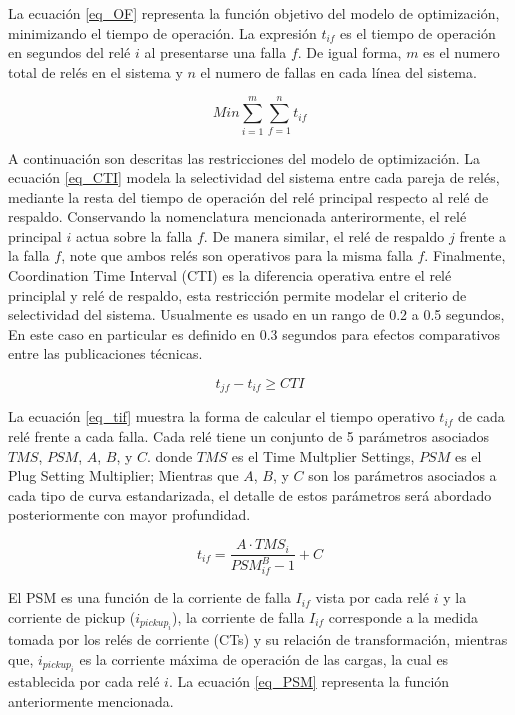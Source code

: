 \documentclass[journal,article,submit,pdftex,moreauthors]{Definitions/mdpi}
\begin{document}
La ecuación \ref{eq_OF} representa la función objetivo del modelo de optimización, minimizando el tiempo de operación. La expresión $t_{if}$ es el tiempo de operación en segundos del relé $i$ al presentarse una falla $f$. De igual forma, $m$ es el numero total de relés en el sistema y $n$ el numero de fallas en cada línea del sistema. 

\begin{equation}\label{eq_OF}
    Min \sum_{i=1}^m \sum_{f=1}^n t_{if}
\end{equation}

A continuación son descritas las restricciones del modelo de optimización. La ecuación \ref{eq_CTI} modela la selectividad del sistema entre cada pareja de relés, mediante la resta del tiempo de operación del relé principal respecto al relé de respaldo. Conservando la nomenclatura mencionada anterirormente, el relé principal $i$ actua sobre la falla $f$. De manera similar, el relé de respaldo $j$ frente a la falla $f$, note que ambos relés son operativos para la misma falla $f$. Finalmente, Coordination Time Interval (CTI) es la diferencia operativa entre el relé principlal y relé de respaldo, esta restricción permite modelar el criterio de selectividad del sistema. Usualmente es usado en un rango de 0.2 a 0.5 segundos, En este caso en particular es definido en 0.3 segundos para efectos comparativos entre las publicaciones técnicas.

\begin{equation}\label{eq_CTI}
    t_{jf} - t_{if} \geq CTI
\end{equation}

La ecuación \ref{eq_tif} muestra la forma de calcular el tiempo operativo $t_{if}$ de cada relé frente a cada falla. Cada relé tiene un conjunto de 5 parámetros asociados $TMS$, $PSM$, $A$, $B$, y $C$. donde $TMS$ es el Time Multplier Settings, $PSM$ es el Plug Setting Multiplier; Mientras que $A$, $B$, y $C$ son los parámetros asociados a cada tipo de curva estandarizada, el detalle de estos parámetros será abordado posteriormente con mayor profundidad.  

\begin{equation}\label{eq_tif}
    t_{if} = \frac{A \cdot TMS_i}{PSM_{if}^B -1 }+C
\end{equation}


El PSM es una función de la corriente de falla $I_{if}$ vista por cada relé $i$ y la corriente de pickup ($i_{pickup_i}$), la corriente de falla $I_{if}$ corresponde a la medida tomada por los relés de corriente (CTs) y su relación de transformación, mientras que, $i_{pickup_i}$ es la corriente máxima de operación de las cargas, la cual es establecida por cada relé $i$. La ecuación \ref{eq_PSM} representa la función anteriormente mencionada.
\end{document}
